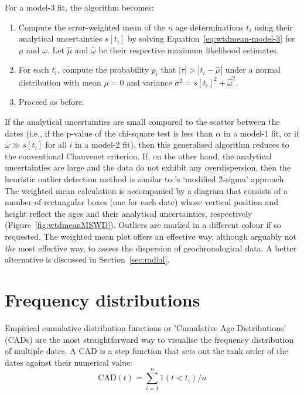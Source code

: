 \begin{refsection}
For a model-3 fit, the algorithm becomes:

\begin{enumerate}
\item Compute the error-weighted mean of the $n$ age determinations
  $t_i$ using their analytical uncertainties $s[t_i]$ by solving
  Equation~\ref{eq:wtdmean-model-3} for $\mu$ and $\omega$. Let
  $\hat{\mu}$ and $\hat{\omega}$ be their respective maximum
  likelihood estimates.
\item For each $t_i$, compute the probability $p_i$ that
  $|\tau|>|t_i-\hat{\mu}|$ under a normal distribution with mean
  $\mu=0$ and variance $\sigma^2=s[t_i]^2+\hat{\omega}^2$.
\item Proceed as before.
\end{enumerate}

If the analytical uncertainties are small compared to the scatter
between the dates (i.e., if the p-value of the chi-square test is less
than $\alpha$ in a model-1 fit, or if $\omega \gg s[t_i]$ for all $i$
in a model-2 fit), then this generalised algorithm reduces to the
conventional Chauvenet criterion. If, on the other hand, the
analytical uncertainties are large and the data do not exhibit any
overdispersion, then the heuristic outlier detection method is similar
to \citet{ludwig2003}'s `modified 2-sigma' approach.\\

The weighted mean calculation is accompanied by a diagram that
consists of a number of rectangular boxes (one for each date) whose
vertical position and height reflect the ages and their analytical
uncertainties, respectively (Figure~\ref{fig:wtdmeanMSWD}).  Outliers
are marked in a different colour if so requested. The weighted mean
plot offers an effective way, although arguably not \emph{the} most
effective way, to assess the dispersion of geochronological data. A
better alternative is discussed in Section~\ref{sec:radial}.

\section{Frequency distributions}
\label{sec:KDE+CAD}

Empirical cumulative distribution functions or 'Cumulative Age
Distributions' (CADs) are the most straightforward way to visualise
the frequency distribution of multiple dates. A CAD is a step function
that sets out the rank order of the dates against their numerical
value:
\begin{equation}
  \mathrm{CAD}(t) = \sum_{i=1}^{n} 1(t<t_i)/n
  \label{eq:CAD}
\end{equation}


\end{refsection}
